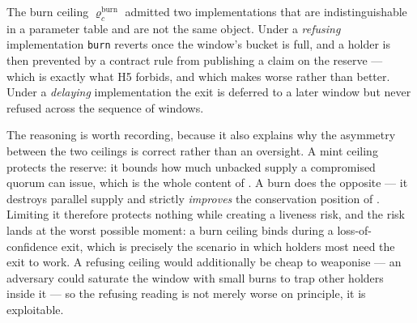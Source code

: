 \begin{remark}
\label{rem:burn-ceiling}
The burn ceiling $\varrho^{\mathrm{burn}}_c$ admitted two implementations that are indistinguishable
in a parameter table and are not the same object. Under a \emph{refusing} implementation
\texttt{burn} reverts once the window's bucket is full, and a holder is then prevented by a contract
rule from publishing a claim on the reserve --- which is exactly what H5 forbids, and which makes
 worse rather than better. Under a \emph{delaying} implementation the exit is
deferred to a later window but never refused across the sequence of windows.


The reasoning is worth recording, because it also explains why the asymmetry between the two ceilings
is correct rather than an oversight. A mint ceiling protects the reserve: it bounds how much
unbacked supply a compromised quorum can issue, which is the whole content of
. A burn does the opposite --- it destroys parallel supply and strictly
\emph{improves} the conservation position of . Limiting it therefore protects
nothing while creating a liveness risk, and the risk lands at the worst possible moment: a burn
ceiling binds during a loss-of-confidence exit, which is precisely the scenario in which holders most
need the exit to work. A refusing ceiling would additionally be cheap to weaponise --- an adversary
could saturate the window with small burns to trap other holders inside it --- so the refusing
reading is not merely worse on principle, it is exploitable.
\end{remark}

